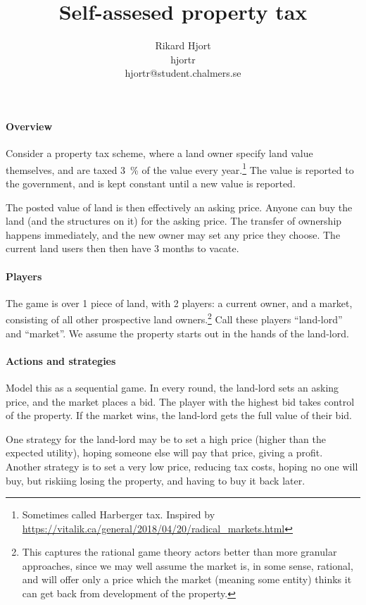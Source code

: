 \documentclass{article}
\title{Self-assesed property tax}
\author{Rikard Hjort\\
  hjortr\\
hjortr@student.chalmers.se}
\begin{document}
\maketitle

\paragraph{Overview}
Consider a property tax scheme, where a land owner specify land value themselves,
and are taxed 3~\% of the value every year.\footnote{Sometimes called Harberger tax. Inspired by \url{https://vitalik.ca/general/2018/04/20/radical_markets.html}} The value is reported to the government, and is kept constant until a new value is reported.

The posted value of land is then effectively an asking price. Anyone can buy the land (and the structures on it)
for the asking price. The transfer of
ownership happens immediately, and the new owner may set any price they choose. The current land users then then have 3 months to vacate.

\paragraph{Players}
The game is over 1 piece of land, with 2 players: a current owner,
and a market, consisting of all other prospective land owners.\footnote{This captures the rational
game theory actors better than more granular approaches, since we may well assume the
market is, in some sense, rational, and will offer only a price which the market
(meaning some entity) thinks it can get back from development of the property.}
Call these players ``land-lord'' and ``market''. We assume the property starts
out in the hands of the land-lord. 

\paragraph{Actions and strategies}
Model this as a sequential game. In every round, the land-lord sets an asking
price, and the market places a bid. The player with the highest bid takes
control of the property. If the market wins, the land-lord gets the full value
of their bid.

One strategy for the land-lord may be to set a high price (higher than the
expected utility), hoping someone else will pay that price, giving a profit.
Another strategy is to set a very low price, reducing tax costs, hoping no one
will buy, but riskiing losing the property, and having to buy it back later.
\end{document}
